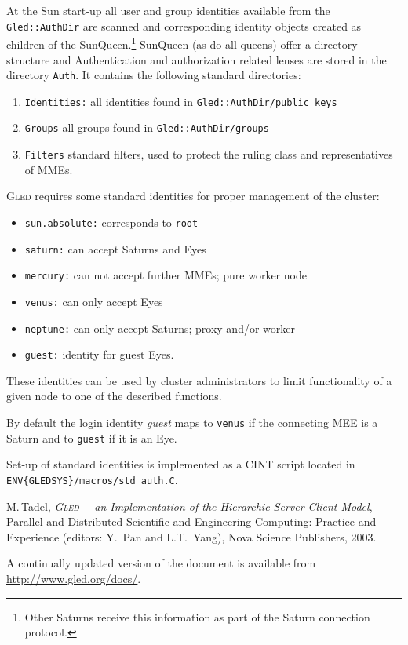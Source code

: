 \documentclass[a4paper,11pt]{article}
\def\gled{\textsc{Gled}\xspace}
\def\smalltt#1{{\small\texttt{#1}}}
\begin{document}
At the Sun start-up all user and group identities available from the
\smalltt{Gled::AuthDir} are scanned and corresponding identity objects
created as children of the SunQueen.\footnote{Other Saturns receive this
information as part of the Saturn connection protocol.} %
SunQueen (as do all queens) offer a directory structure and
Authentication and authorization related lenses are stored in the
directory \smalltt{Auth}. It contains the following standard directories:
\begin{enumerate}\parsep=0pt\itemsep=0pt
\item \texttt{Identities:} all identities found in
  \smalltt{Gled::AuthDir/public\_keys}
\item \texttt{Groups} all groups found in \smalltt{Gled::AuthDir/groups}
\item \texttt{Filters} standard filters, used to protect the ruling
  class and representatives of MMEs.
\end{enumerate}

\gled requires some standard identities for proper management of the
cluster:
\begin{itemize}\parsep=0pt\itemsep=0pt
\item \texttt{sun.absolute:} corresponds to \smalltt{root}
\item \texttt{saturn:} can accept Saturns and Eyes
\item \texttt{mercury:} can not accept further MMEs; pure worker node
\item \texttt{venus:} can only accept Eyes
\item \texttt{neptune:} can only accept Saturns; proxy and/or worker
\item \texttt{guest:} identity for guest Eyes.
\end{itemize}
These identities can be used by cluster administrators to limit
functionality of a given node to one of the described functions.

By default the login identity \emph{guest} maps to \smalltt{venus} if
the connecting MEE is a Saturn and to \smalltt{guest} if it is an Eye.

Set-up of standard identities is implemented as a CINT script located in
\smalltt{ENV\{GLEDSYS\}/\-macros/\-std\_auth.C}.


\begin{thebibliography}{9}
 M.\,Tadel, \emph{\gled\ -- an Implementation of the
    Hierarchic Server-Client Model}, Parallel and Distributed
  Scientific and Engineering Computing: Practice and Experience
  (editors: Y.~Pan and L.T.~Yang), Nova Science Publishers, 2003.

  A continually updated version of the
  document is available from \url{http://www.gled.org/docs/}.

\end{thebibliography}
\end{document}
